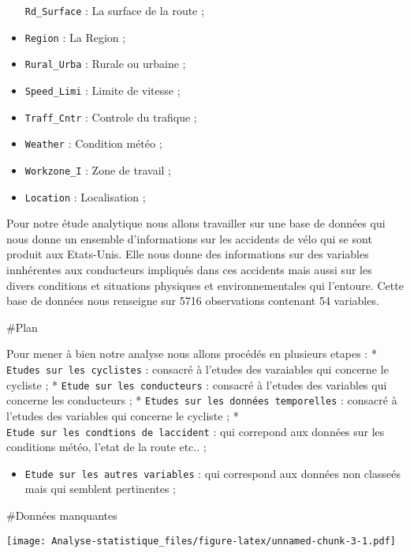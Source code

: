 \documentclass[
  french,
]{article}
\providecommand{\tightlist}{%
  \setlength{\itemsep}{0pt}\setlength{\parskip}{0pt}}
\begin{document}
\begin{itemize}
  \texttt{Rd\_Surface} : La surface de la route ;
\item
  \texttt{Region} : La Region ;
\item
  \texttt{Rural\_Urba} : Rurale ou urbaine ;
\item
  \texttt{Speed\_Limi} : Limite de vitesse ;
\item
  \texttt{Traff\_Cntr} : Controle du trafique ;
\item
  \texttt{Weather} : Condition météo ;
\item
  \texttt{Workzone\_I} : Zone de travail ;
\item
  \texttt{Location} : Localisation ;
\end{itemize}

Pour notre étude analytique nous allons travailler sur une base de
données qui nous donne un ensemble d'informations sur les accidents de
vélo qui se sont produit aux Etats-Unis. Elle nous donne des
informations sur des variables innhérentes aux conducteurs impliqués
dans ces accidents mais aussi sur les divers conditions et situations
physiques et environnementales qui l'entoure. Cette base de données nous
renseigne sur 5716 observations contenant 54 variables.

\#Plan

Pour mener à bien notre analyse nous allons procédés en plusieurs etapes
: * \texttt{Etudes\ sur\ les\ cyclistes} : consacré à l'etudes des
varaiables qui concerne le cycliste ; *
\texttt{Etude\ sur\ les\ conducteurs} : consacré à l'etudes des
variables qui concerne les conducteurs ; *
\texttt{Etudes\ sur\ les\ données\ temporelles} : consacré à l'etudes
des variables qui concerne le cycliste ; *
\texttt{Etude\ sur\ les\ condtions\ de\ l\textquotesingle{}accident} :
qui correpond aux données sur les conditions météo, l'etat de la route
etc.. ;

\begin{itemize}
\tightlist
\item
  \texttt{Etude\ sur\ les\ autres\ variables} : qui correspond aux
  données non classeés mais qui semblent pertinentes ;
\end{itemize}

\#Données manquantes

\texttt{[image: Analyse-statistique\_files/figure-latex/unnamed-chunk-3-1.pdf]}
\end{document}
